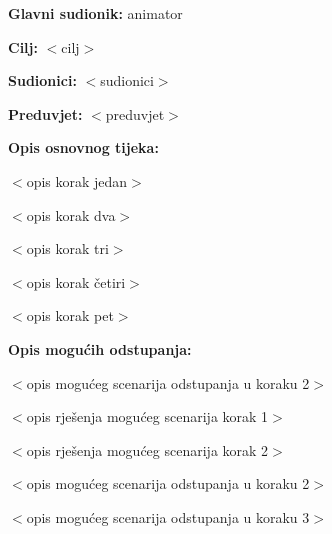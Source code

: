 					\noindent {}
					\begin{packed_item}
						
						\item \textbf{Glavni sudionik: }animator
						\item  \textbf{Cilj:} $<$cilj$>$
						\item  \textbf{Sudionici:} $<$sudionici$>$
						\item  \textbf{Preduvjet:} $<$preduvjet$>$
						\item  \textbf{Opis osnovnog tijeka:}
						
						\item[] \begin{packed_enum}
							
							\item $<$opis korak jedan$>$
							\item $<$opis korak dva$>$
							\item $<$opis korak tri$>$
							\item $<$opis korak četiri$>$
							\item $<$opis korak pet$>$
						\end{packed_enum}
						
						\item  \textbf{Opis mogućih odstupanja:}
						
						\item[] \begin{packed_item}
							
							\item[2.a] $<$opis mogućeg scenarija odstupanja u koraku 2$>$
							\item[] \begin{packed_enum}
								
								\item $<$opis rješenja mogućeg scenarija korak 1$>$
								\item $<$opis rješenja mogućeg scenarija korak 2$>$
								
							\end{packed_enum}
							\item[2.b] $<$opis mogućeg scenarija odstupanja u koraku 2$>$
							\item[3.a] $<$opis mogućeg scenarija odstupanja  u koraku 3$>$
							
						\end{packed_item}
					\end{packed_item}
				
